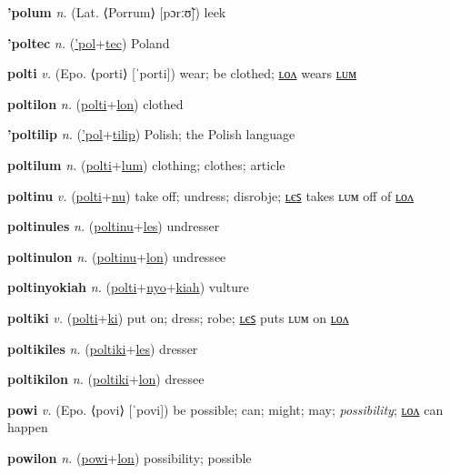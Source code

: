 \textbf{\hypertarget{'polum}{'polum}} \textit{n.} (Lat. ⟨Porrum⟩ [pɔrːʊ̃])
leek

\textbf{\hypertarget{'poltec}{'poltec}} \textit{n.} (\hyperlink{'pol}{'pol}+\allowbreak \hyperlink{tec}{tec})
Poland

\textbf{\hypertarget{polti}{polti}} \textit{v.} (Epo. ⟨porti⟩ [ˈporti])
wear; be clothed; \hyperlink{poltilon}{ʟᴏᴧ} wears \hyperlink{poltilum}{ʟᴜᴍ}

\textbf{\hypertarget{poltilon}{poltilon}} \textit{n.} (\hyperlink{polti}{polti}+\allowbreak \hyperlink{lon}{lon})
clothed

\textbf{\hypertarget{'poltilip}{'poltilip}} \textit{n.} (\hyperlink{'pol}{'pol}+\allowbreak \hyperlink{tilip}{tilip})
Polish; the Polish language

\textbf{\hypertarget{poltilum}{poltilum}} \textit{n.} (\hyperlink{polti}{polti}+\allowbreak \hyperlink{lum}{lum})
clothing; clothes; article

\textbf{\hypertarget{poltinu}{poltinu}} \textit{v.} (\hyperlink{polti}{polti}+\allowbreak \hyperlink{nu}{nu})
take off; undress; disrobje; \hyperlink{poltinules}{ʟєꜱ} takes ʟᴜᴍ off of \hyperlink{poltinulon}{ʟᴏᴧ}

\textbf{\hypertarget{poltinules}{poltinules}} \textit{n.} (\hyperlink{poltinu}{poltinu}+\allowbreak \hyperlink{les}{les})
undresser

\textbf{\hypertarget{poltinulon}{poltinulon}} \textit{n.} (\hyperlink{poltinu}{poltinu}+\allowbreak \hyperlink{lon}{lon})
undressee

\textbf{\hypertarget{poltinyokiah}{poltinyokiah}} \textit{n.} (\hyperlink{polti}{polti}+\allowbreak \hyperlink{nyo}{nyo}+\allowbreak \hyperlink{kiah}{kiah})
vulture

\textbf{\hypertarget{poltiki}{poltiki}} \textit{v.} (\hyperlink{polti}{polti}+\allowbreak \hyperlink{ki}{ki})
put on; dress; robe; \hyperlink{poltikiles}{ʟєꜱ} puts ʟᴜᴍ on \hyperlink{poltikilon}{ʟᴏᴧ}

\textbf{\hypertarget{poltikiles}{poltikiles}} \textit{n.} (\hyperlink{poltiki}{poltiki}+\allowbreak \hyperlink{les}{les})
dresser

\textbf{\hypertarget{poltikilon}{poltikilon}} \textit{n.} (\hyperlink{poltiki}{poltiki}+\allowbreak \hyperlink{lon}{lon})
dressee

\textbf{\hypertarget{powi}{powi}} \textit{v.} (Epo. ⟨povi⟩ [ˈpovi])
be possible; can; might; may; \textit{possibility}; \hyperlink{powilon}{ʟᴏᴧ} can happen

\textbf{\hypertarget{powilon}{powilon}} \textit{n.} (\hyperlink{powi}{powi}+\allowbreak \hyperlink{lon}{lon})
possibility; possible

